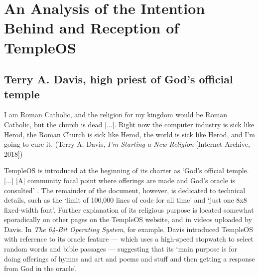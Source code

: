 \documentclass[Draft.tex]{subfiles}
\begin{document}
\chapter{An Analysis of the Intention Behind and Reception of TempleOS}

\section*{Terry A. Davis, high priest of God's official temple}

\begin{displayquote}
  I am Roman Catholic, and the religion for my kingdom
  would be Roman Catholic, but the church is dead [...].
  Right now the computer industry is sick like Herod,
  the Roman Church is sick like Herod,
  the world is sick like Herod, and I'm going to cure it.
	(Terry A. Davis, \textit{I'm Starting a New Religion} [Internet Archive, 2018])
\end{displayquote}

TempleOS is introduced at the beginning of its charter as
`God's official temple. [...] [A] community focal point
where offerings are made and God's oracle is consulted' \parencite{Charter}.
The remainder of the document, however, is dedicated to technical details,
such as the `limit of 100,000 lines of code for all time'
and `just one 8x8 fixed-width font'.
Further explanation of its religious purpose is located somewhat sporadically
on other pages on the TempleOS website, and in videos uploaded by Davis.
In \textit{The 64-Bit Operating System}, for example,
Davis \parencite*{64-Bit} introduced TempleOS
with reference to its oracle feature --- which uses a high-speed
stopwatch to select random words and bible passages --- suggesting that its
`main purpose is for doing offerings of hymns and art and poems and stuff
and then getting a response from God in the oracle'.
\end{document}
